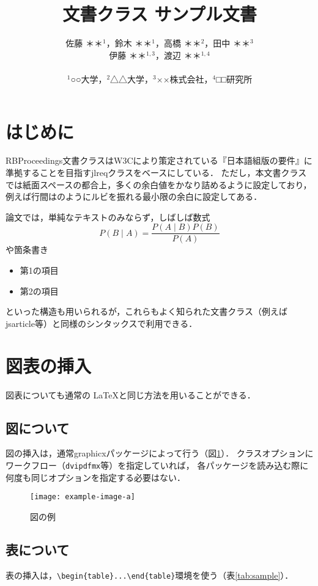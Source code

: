 \documentclass[platex,dvipdfmx]{rbproceedings}
\title{\pkg{RBProceedings}文書クラス サンプル文書}
\author{%
佐藤 ＊＊${}^{1}$，鈴木 ＊＊${}^{1}$，高橋 ＊＊${}^{2}$，田中 ＊＊${}^{3}$\\
伊藤 ＊＊${}^{1,3}$，渡辺 ＊＊${}^{1,4}$\\ \\
${}^{1}$○○大学，${}^{2}$△△大学，${}^{3}$××株式会社，${}^{4}$□□研究所
}
\newcommand{\pkg}[1]{\textsf{#1}}
\newcommand{\code}[1]{\texttt{#1}}
\begin{document}
\maketitle

\section{はじめに}
\pkg{RBProceedings}文書クラスはW3Cにより策定されている『日本語組版の要件』\cite{JLREQ}に準拠することを目指す\pkg{jlreq}クラスをベースにしている．
ただし，本文書クラスでは紙面スペースの都合上，多くの余白値をかなり詰めるように設定しており，例えば行間はのようにルビを振れる最小限の余白に設定してある．

論文では，単純なテキストのみならず，しばしば数式
\begin{equation}
P(B\mid A) = \frac{P(A\mid B)P(B)}{P(A)}
\end{equation}
や箇条書き
\begin{itemize}
\item 第1の項目
\item 第2の項目
\end{itemize}
といった構造も用いられるが，これらもよく知られた文書クラス（例えば\pkg{jsarticle}等）と同様のシンタックスで利用できる．

\section{図表の挿入}
図表についても通常の \LaTeX と同じ方法を用いることができる．

\subsection{図について}
図の挿入は，通常\pkg{graphicx}パッケージによって行う（図\ref{fig:sample}）．
クラスオプションにワークフロー（\code{dvipdfmx}等）を指定していれば，
各パッケージを読み込む際に何度も同じオプションを指定する必要はない．

\begin{figure}[t]
\centering
\texttt{[image: example-image-a]}
\caption{図の例}
\label{fig:sample}
\end{figure}

\subsection{表について}
表の挿入は，\verb|\begin{table}...\end{table}|環境を使う（表\ref{tab:sample}）．
\end{document}
